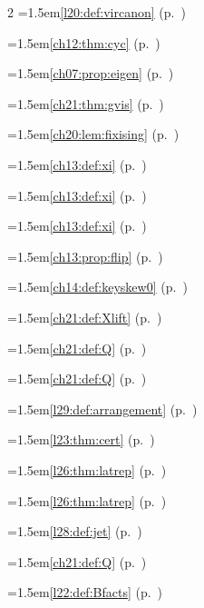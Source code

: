 \begin{multicols}{2}
\hangindent=1.5em\quad \ref{l20:def:vircanon} (p.~\pageref{l20:def:vircanon})\par
\hangindent=1.5em\quad \ref{ch12:thm:cyc} (p.~\pageref{ch12:thm:cyc})\par
\hangindent=1.5em\quad \ref{ch07:prop:eigen} (p.~\pageref{ch07:prop:eigen})\par
\hangindent=1.5em\quad \ref{ch21:thm:gvis} (p.~\pageref{ch21:thm:gvis})\par
\hangindent=1.5em\quad \ref{ch20:lem:fixising} (p.~\pageref{ch20:lem:fixising})\par
\hangindent=1.5em\quad \ref{ch13:def:xi} (p.~\pageref{ch13:def:xi})\par
\hangindent=1.5em\quad \ref{ch13:def:xi} (p.~\pageref{ch13:def:xi})\par
\hangindent=1.5em\quad \ref{ch13:def:xi} (p.~\pageref{ch13:def:xi})\par
\hangindent=1.5em\quad \ref{ch13:prop:flip} (p.~\pageref{ch13:prop:flip})\par
\hangindent=1.5em\quad \ref{ch14:def:keyskew0} (p.~\pageref{ch14:def:keyskew0})\par
\hangindent=1.5em\quad \ref{ch21:def:Xlift} (p.~\pageref{ch21:def:Xlift})\par
\hangindent=1.5em\quad \ref{ch21:def:Q} (p.~\pageref{ch21:def:Q})\par
\hangindent=1.5em\quad \ref{ch21:def:Q} (p.~\pageref{ch21:def:Q})\par
\hangindent=1.5em\quad \ref{l29:def:arrangement} (p.~\pageref{l29:def:arrangement})\par
\hangindent=1.5em\quad \ref{l23:thm:cert} (p.~\pageref{l23:thm:cert})\par
\hangindent=1.5em\quad \ref{l26:thm:latrep} (p.~\pageref{l26:thm:latrep})\par
\hangindent=1.5em\quad \ref{l26:thm:latrep} (p.~\pageref{l26:thm:latrep})\par
\hangindent=1.5em\quad \ref{l28:def:jet} (p.~\pageref{l28:def:jet})\par
\hangindent=1.5em\quad \ref{ch21:def:Q} (p.~\pageref{ch21:def:Q})\par
\hangindent=1.5em\quad \ref{l22:def:Bfacts} (p.~\pageref{l22:def:Bfacts})\par

\end{multicols}
